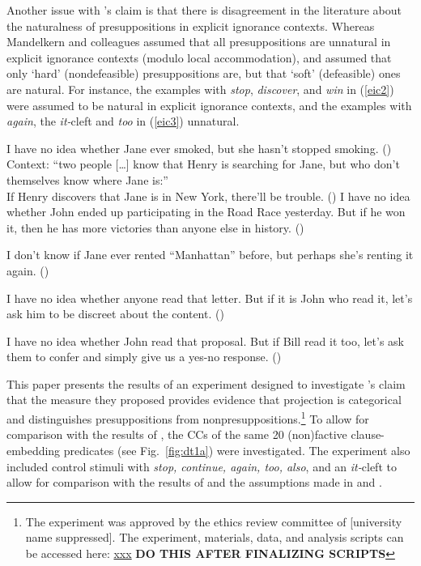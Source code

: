 \documentclass[11pt,fleqn]{article}
\def\verymarginal{{\leavevmode\llap{??}}}
\def\infelic{{\leavevmode\llap{\#}}}
\newcommand{\6}{\mbox{$[\hspace*{-.6mm}[$}}
\newcommand{\9}{\mbox{$]\hspace*{-.6mm}]$}}
\newcommand{\citepos}[1]{\citeauthor{#1}'s \citeyear{#1}}
\begin{document}
Another issue with \citepos{mandelkern-etal2020} claim is that there is disagreement in the literature about the naturalness of presuppositions in explicit ignorance contexts. Whereas Mandelkern and colleagues assumed that all presuppositions are unnatural in explicit ignorance contexts (modulo local accommodation), \citealt{simons01} and \citealt{abusch10} assumed that only `hard' (nondefeasible) presuppositions are, but that `soft' (defeasible) ones are natural. For instance,  the examples with {\em stop}, {\em discover}, and {\em win} in (\ref{eic2}) were assumed to be natural in explicit ignorance contexts, and the examples with {\em again}, the {\em it-}cleft and {\em too} in (\ref{eic3}) unnatural.

\begin{exe}
\ex\label{eic2}
\begin{xlist}
\ex I have no idea whether Jane ever smoked, but she hasn't stopped smoking. \hfill (\citealt[443]{simons01})
\ex Context: ``two people [\ldots] know that Henry is searching for Jane, but who don't themselves know where Jane is:'' \\ If Henry discovers that Jane is in New York, there'll be trouble. \hfill (\citealt[434]{simons01})
\ex I have no idea whether John ended up participating in the
Road Race yesterday. But if he won it, then he has more victories than anyone else in history. \hfill (\citealt[39]{abusch10})
\end{xlist}
\ex\label{eic3}
\begin{xlist}
\ex\infelic I don't know if Jane ever rented ``Manhattan'' before, but perhaps she's renting it again. \hfill (\citealt[443]{simons01})

\ex \verymarginal I have no idea whether anyone read that letter. But if it is John
who read it, let's ask him to be discreet about the content. \hfill (\citealt[40]{abusch10})

\ex \verymarginal I have no idea whether John read that proposal. But if Bill read it too, let's ask them to confer and simply give us a yes-no response. \hfill (\citealt[40]{abusch10})
\end{xlist}
\end{exe}

This paper presents the results of an experiment designed to investigate \citepos{mandelkern-etal2020} claim that the measure they proposed provides evidence that projection is categorical and distinguishes presuppositions from nonpresuppositions.\footnote{\label{f:github}The experiment was approved by the ethics review committee of [university name suppressed]. The experiment, materials, data, and analysis scripts can be accessed here:  \url{xxx} {\bf DO THIS AFTER FINALIZING SCRIPTS}}  To allow for comparison with the results of \citealt{degen-tonhauser-language}, the CCs of the same 20 (non)factive clause-embedding predicates (see Fig.~\ref{fig:dt1a}) were investigated. The experiment also included control stimuli with {\em stop, continue, again, too, also}, and an {\em it-}cleft to allow for comparison with the results of \citealt{mandelkern-etal2020} and the assumptions made in \citealt{simons01} and \citealt{abusch10}. 
\end{document}
